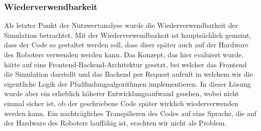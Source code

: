 \documentclass[main.tex]{subfiles} %
\begin{document}
\subsubsection{Wiederverwendbarkeit}
Als letzter Punkt der Nutzwertanalyse wurde die Wiederverwendbarkeit der Simulation betrachtet.
Mit der Wiederverwendbarkeit ist hauptsächlich gemeint, dass der Code so gestaltet werden soll, dass
diser später auch auf der Hardware des Roboters verwenden werden kann. Das Konzept, das hier evaluiert wurde,
hätte auf eine Frontend-Backend-Architektur gesetzt, bei welcher das Frontend die Simulation darstellt und das
Backend per Request aufruft in welchem wir die eigentliche Logik der Pfadfindungsalgorithmen implementieren.
In dieser Lösung wurde aber ein erheblich höherer Entwicklungsaufwand gesehen, wobei nicht einmal sicher ist,
ob der geschriebene Code später wirklich wiederverwenden werden kann. Ein nachträgliches Transpilieren des Codes auf eine
Sprache, die auf der Hardware des Roboters lauffähig ist, erachten wir nicht als Problem.
\end{document}
